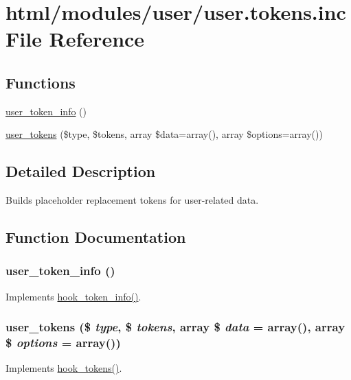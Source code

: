 \hypertarget{user_8tokens_8inc}{
\section{html/modules/user/user.tokens.inc File Reference}
\label{user_8tokens_8inc}
}
\subsection*{Functions}
\begin{DoxyCompactItemize}
\item 
\hyperlink{user_8tokens_8inc_aa0d974f197db2ef1b4901b376fd9f51b}{user\_\-token\_\-info} ()
\item 
\hyperlink{user_8tokens_8inc_ac38b7e96d0ee2f9797f659ab573f855d}{user\_\-tokens} (\$type, \$tokens, array \$data=array(), array \$options=array())
\end{DoxyCompactItemize}


\subsection{Detailed Description}
Builds placeholder replacement tokens for user-\/related data. 

\subsection{Function Documentation}
\hypertarget{user_8tokens_8inc_aa0d974f197db2ef1b4901b376fd9f51b}{
\subsubsection[{user\_\-token\_\-info}]{\setlength{\rightskip}{0pt plus 5cm}user\_\-token\_\-info ()}}
\label{user_8tokens_8inc_aa0d974f197db2ef1b4901b376fd9f51b}
Implements \hyperlink{group__hooks_gab868597197cf36911f95dcd29ae0b954}{hook\_\-token\_\-info()}. \hypertarget{user_8tokens_8inc_ac38b7e96d0ee2f9797f659ab573f855d}{
\subsubsection[{user\_\-tokens}]{\setlength{\rightskip}{0pt plus 5cm}user\_\-tokens (\$ {\em type}, \/  \$ {\em tokens}, \/  array \$ {\em data} = {\ttfamily array()}, \/  array \$ {\em options} = {\ttfamily array()})}}
\label{user_8tokens_8inc_ac38b7e96d0ee2f9797f659ab573f855d}
Implements \hyperlink{group__hooks_ga3bfd87d9a19b2397b0f970e1cff7ea4f}{hook\_\-tokens()}. 